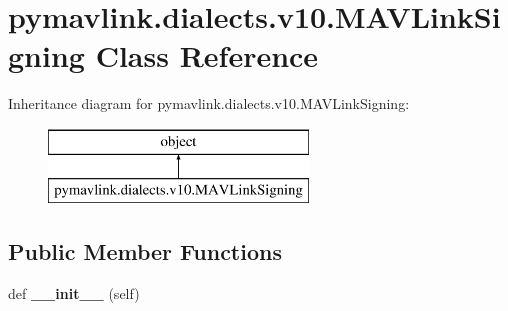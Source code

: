 \hypertarget{classpymavlink_1_1dialects_1_1v10_1_1MAVLinkSigning}{}\section{pymavlink.\+dialects.\+v10.\+M\+A\+V\+Link\+Signing Class Reference}
\label{classpymavlink_1_1dialects_1_1v10_1_1MAVLinkSigning}
Inheritance diagram for pymavlink.\+dialects.\+v10.\+M\+A\+V\+Link\+Signing\+:\begin{figure}[H]
\begin{center}
\leavevmode
\includegraphics[height=2.000000cm]{classpymavlink_1_1dialects_1_1v10_1_1MAVLinkSigning}
\end{center}
\end{figure}
\subsection*{Public Member Functions}
\begin{DoxyCompactItemize}
\item 
\mbox{\label{classpymavlink_1_1dialects_1_1v10_1_1MAVLinkSigning_af78069f93093789cf95e7c56cfce4bd5}} 
def {\bfseries \+\_\+\+\_\+init\+\_\+\+\_\+} (self)
\end{DoxyCompactItemize}

